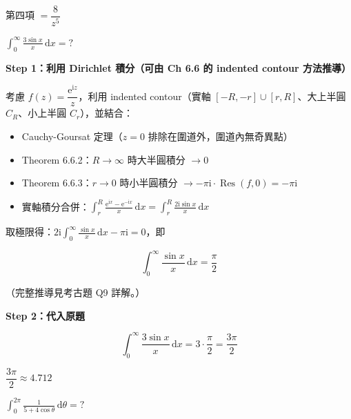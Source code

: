 \documentclass[12pt,a4paper]{article}
\newcommand{\dd}{\,\mathrm{d}}
\newcommand{\ii}{\mathrm{i}}
\newcommand{\ee}{\mathrm{e}}
\newcommand{\Res}{\operatorname{Res}}
\begin{document}
\begin{ansbox}
第四項 $=\boxed{\dfrac{8}{z^5}}$
\end{ansbox}

\begin{qbox}[第 9 題\,---\,實數積分]
$\displaystyle\int_0^{\infty}\frac{3\sin x}{x}\dd{x}=?$
\end{qbox}

\begin{solbox}[解]
\textbf{Step 1：利用 Dirichlet 積分（可由 Ch 6.6 的 indented contour 方法推導）}

考慮 $f(z)=\dfrac{\ee^{\ii z}}{z}$，利用 indented contour（實軸 $[-R,-r]\cup[r,R]$、大上半圓 $C_R$、小上半圓 $C_r$），並結合：
\begin{itemize}
\item Cauchy-Goursat 定理（$z=0$ 排除在圍道外，圍道內無奇異點）
\item Theorem 6.6.2：$R\to\infty$ 時大半圓積分 $\to 0$
\item Theorem 6.6.3：$r\to 0$ 時小半圓積分 $\to -\pi\ii\cdot\Res(f,0)=-\pi\ii$
\item 實軸積分合併：$\displaystyle\int_r^R\frac{\ee^{\ii x}-\ee^{-\ii x}}{x}\dd{x}=\int_r^R\frac{2\ii\sin x}{x}\dd{x}$
\end{itemize}

取極限得：$2\ii\displaystyle\int_0^{\infty}\frac{\sin x}{x}\dd{x}-\pi\ii=0$，即

$$\int_0^{\infty}\frac{\sin x}{x}\dd{x}=\frac{\pi}{2}$$

（完整推導見考古題 Q9 詳解。）

\textbf{Step 2：代入原題}

$$\int_0^{\infty}\frac{3\sin x}{x}\dd{x}=3\cdot\frac{\pi}{2}=\frac{3\pi}{2}$$
\end{solbox}

\begin{ansbox}
$\boxed{\dfrac{3\pi}{2}\approx 4.712}$
\end{ansbox}

\begin{qbox}[第 10 題\,---\,三角積分]
$\displaystyle\int_0^{2\pi}\frac{1}{5+4\cos\theta}\dd{\theta}=?$
\end{qbox}
\end{document}
